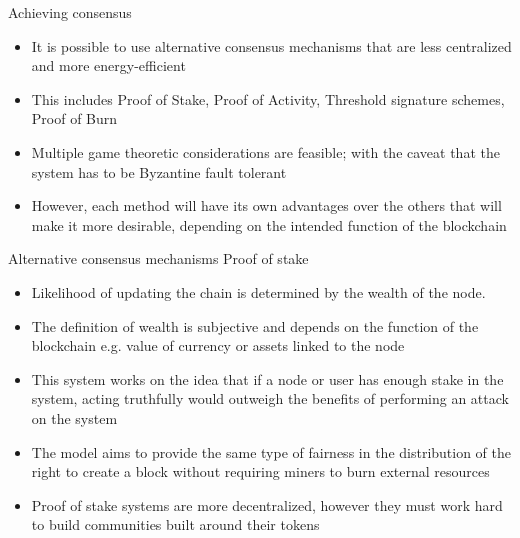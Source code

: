 \documentclass[9pt]{beamer}
\begin{document}

\begin{frame}{Achieving consensus}
	\begin{itemize}
		\item It is possible to use alternative consensus mechanisms that are less centralized and more energy-efficient
		\item This includes Proof of Stake, Proof of Activity, Threshold signature schemes, Proof of Burn
		\item Multiple game theoretic considerations are feasible; with the caveat that the system has to be Byzantine fault tolerant
		\item However, each method will have its own advantages over the others that will make it more desirable, depending on the intended function of the blockchain
	\end{itemize}
\end{frame}


\begin{frame}{Alternative consensus mechanisms}
	Proof of stake
	\begin{itemize}
		\item Likelihood of updating the chain is determined by the wealth of the node.
		\item The definition of wealth is subjective and depends on the function of the blockchain e.g. value of currency or assets linked to the node
		\item This system works on the idea that if a node or user has enough stake in the system, acting truthfully would outweigh the benefits of performing an attack on the system
		\item The model aims to provide the same type of fairness in the distribution of the right to create a block without requiring miners to burn external resources
		\item Proof of stake systems are more decentralized, however they must work hard to build communities built around their tokens
	\end{itemize}
\end{frame}

\end{document}
